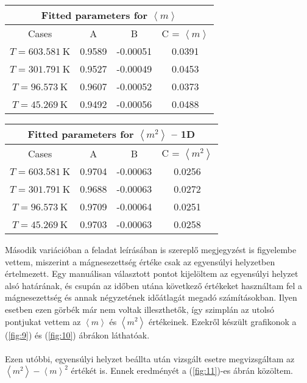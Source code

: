 \begin{center}
\begin{tabular}{c||c|c|c}
\hline
\multicolumn{4}{c}{Fitted parameters for $\left< m \right>$} -- 1D\\ \hline \hline
Cases          & A         & B     & C = $\left< m \right>$ \\ \hline
$T=603.581\ $K & 0.9589 & -0.00051 & 0.0391                 \\ \hline
$T=301.791\ $K & 0.9527 & -0.00049 & 0.0453                 \\ \hline
$T=96.573\ $K  & 0.9607 & -0.00052 & 0.0373                 \\ \hline
$T=45.269\ $K  & 0.9492 & -0.00056 & 0.0488                 \\ \hline
\end{tabular}
\end{center}
\label{tab:1}

\begin{center}
\begin{tabular}{c||c|c|c}
\hline
\multicolumn{4}{c}{Fitted parameters for $\left< m^{2} \right>$ -- 1D}\\ \hline \hline
Cases          & A         & B     & C = $\left< m^{2} \right>$ \\ \hline
$T=603.581\ $K & 0.9704 & -0.00063 & 0.0256                 \\ \hline
$T=301.791\ $K & 0.9688 & -0.00063 & 0.0272                 \\ \hline
$T=96.573\ $K  & 0.9709 & -0.00064 & 0.0251                 \\ \hline
$T=45.269\ $K  & 0.9703 & -0.00063 & 0.0258                 \\ \hline
\end{tabular}
\end{center}
\label{tab:2}
\hfill \break
Második variációban a feladat leírásában is szereplő megjegyzést is figyelembe vettem, miszerint a mágnesezettség értéke csak az egyensúlyi helyzetben értelmezett. Egy manuálisan választott pontot kijelöltem az egyensúlyi helyzet alsó határának, és csupán az időben utána következő értékeket használtam fel a mágnesezettség és annak négyzetének időátlagát megadó számításokban. Ilyen esetben ezen görbék már nem voltak illeszthetők, így szimplán az utolsó pontjukat vettem az $\left< m \right>$ és $\left< m^{2} \right>$ értékeinek. Ezekről készült grafikonok a (\ref{fig:9}) és (\ref{fig:10}) ábrákon láthatóak.
\\ \\
Ezen utóbbi, egyensúlyi helyzet beállta után vizsgált esetre megvizsgáltam az $\left< m^{2} \right> - \left< m \right>^{2}$ értékét is. Ennek eredményét a (\ref{fig:11})-es ábrán közöltem.

